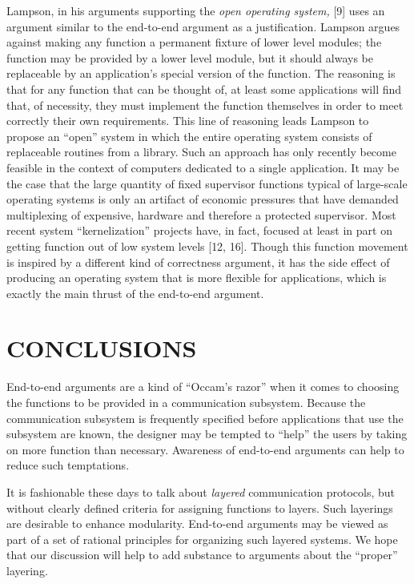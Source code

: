 \documentclass[a4paper,12pt,notitlepage,twoside,openright]{article}
\begin{document}
Lampson, in his arguments supporting the \emph{open operating system,}
{[}9{]} uses an argument similar to the end-to-end argument as a
justification. Lampson argues
against making any function a permanent fixture of lower level modules;
the function may be provided by a lower level module, but it should
always be replaceable by an application's special version of the
function. The reasoning is that for any function that can be thought of,
at least some applications will find that, of necessity, they must
implement the function themselves in order to meet correctly their own
requirements. This line of reasoning leads Lampson to propose an ``open''
system in which the entire operating system consists of replaceable
routines from a library. Such an approach has only recently become
feasible in the context of computers dedicated to a single application.
It may be the case that the large quantity of fixed supervisor functions
typical of large-scale operating systems is only an artifact of economic
pressures that have demanded multiplexing of expensive, hardware and
therefore a protected supervisor. Most recent system ``kernelization''
projects have, in fact, focused at least in part on getting function out
of low system levels {[}12, 16{]}. Though this function movement is
inspired by a different kind of correctness argument, it has the side
effect of producing an operating system that is more flexible for
applications, which is exactly the main thrust of the end-to-end
argument.


\hypertarget{conclusions}{%
\section{CONCLUSIONS}\label{conclusions}}

End-to-end arguments are a kind of ``Occam's razor'' when it comes to
choosing the functions to be provided in a communication subsystem.
Because the communication subsystem is frequently specified before
applications that use the subsystem are known, the designer may be
tempted to ``help'' the users by taking on more function than necessary.
Awareness of end-to-end arguments can help to reduce such temptations.

It is fashionable these days to talk about \emph{layered} communication
protocols, but without clearly defined criteria for assigning functions
to layers. Such layerings are desirable to enhance modularity.
End-to-end arguments may be viewed as part of a set of rational
principles for organizing such layered systems. We hope that our
discussion will help to add substance to arguments about the ``proper''
layering.
\end{document}
